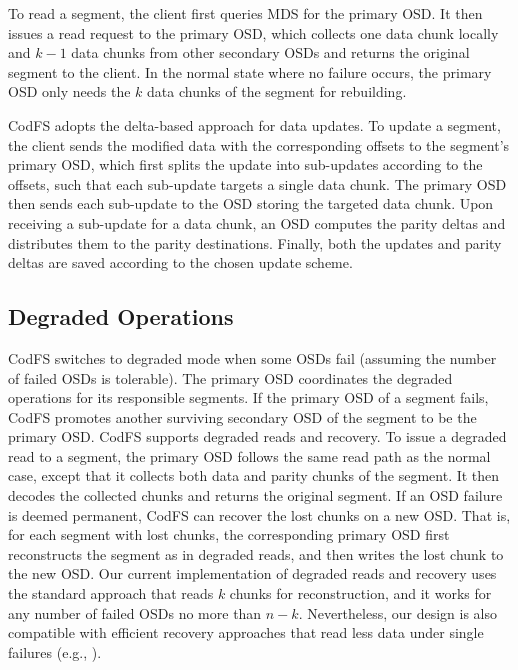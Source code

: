 To read a segment, the client first queries MDS for the primary OSD.  It then
issues a read request to the primary OSD, which collects one data chunk
locally and $k-1$ data chunks from other secondary OSDs and returns the
original segment to the client. In the normal state where no failure occurs,
the primary OSD only needs the $k$ data chunks of the segment for rebuilding. 

CodFS adopts the delta-based approach for data updates.  
To update a segment, the client sends the modified data with the corresponding offsets
to the segment's primary OSD, which 
first splits the update into sub-updates according to the offsets, 
such that each sub-update targets a single data chunk. The primary OSD then 
sends each sub-update to the OSD storing the targeted data chunk.
Upon receiving a sub-update for a data chunk, an OSD computes the parity
deltas and distributes them to the parity destinations. Finally, both the updates and 
parity deltas are saved according to the chosen update scheme.

\subsection{Degraded Operations}

CodFS switches to degraded mode when some OSDs fail (assuming the number of
failed OSDs is tolerable). 
The primary OSD coordinates the degraded operations for its responsible
segments.  If the primary OSD of a segment fails, CodFS promotes another
surviving secondary OSD of the segment to be the primary OSD.  CodFS supports
degraded reads and recovery.  To issue a degraded read to a segment, the
primary OSD follows the same read path as the normal case, except that it
collects both data and parity chunks of the segment.  It then decodes the
collected chunks and returns the original segment.  If an OSD failure is
deemed permanent, CodFS can recover the lost chunks on a new OSD.  That is,
for each segment with lost chunks, the corresponding primary OSD first
reconstructs the segment as in degraded reads, and then writes the lost chunk
to the new OSD.   Our current implementation of degraded reads and recovery
uses the standard approach that reads $k$ chunks for reconstruction, and it
works for any number of failed OSDs no more than $n-k$.  Nevertheless, our
design is also compatible with efficient recovery approaches that read less
data under single failures (e.g., \cite{xiang10,khan12}). 

